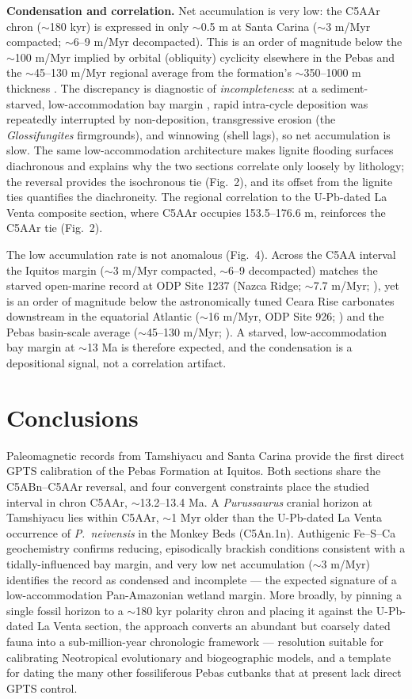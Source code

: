 \documentclass[12pt]{article}
\begin{document}
\textbf{Condensation and correlation.} Net accumulation is very low: the C5AAr chron
($\sim$180 kyr) is expressed in only $\sim$0.5 m at Santa Carina ($\sim$3 m/Myr compacted;
$\sim$6--9 m/Myr decompacted). This is an order of magnitude below the $\sim$100 m/Myr
implied by orbital (obliquity) cyclicity elsewhere in the Pebas \citep{Hoorn2022} and the
$\sim$45--130 m/Myr regional average from the formation's $\sim$350--1000 m thickness
\citep{Hoorn2010}. The discrepancy is diagnostic of \emph{incompleteness}: at a
sediment-starved, low-accommodation bay margin \citep{Gingras2002}, rapid intra-cycle
deposition was repeatedly interrupted by non-deposition, transgressive erosion (the
\textit{Glossifungites} firmgrounds), and winnowing (shell lags), so net accumulation is
slow. The same low-accommodation architecture makes lignite flooding surfaces diachronous
and explains why the two sections correlate only loosely by lithology; the reversal
provides the isochronous tie (Fig.~2), and its offset from the lignite ties quantifies the
diachroneity. The regional correlation to the U-Pb-dated La Venta composite section, where C5AAr occupies
153.5--176.6 m, reinforces the C5AAr tie (Fig.~2).

The low accumulation rate is not anomalous (Fig.~4). Across the C5AA interval the Iquitos
margin ($\sim$3 m/Myr compacted, $\sim$6--9 decompacted) matches the starved open-marine record
at ODP Site 1237 (Nazca Ridge; $\sim$7.7 m/Myr; \citealp{Mix2003}), yet is an order of magnitude
below the astronomically tuned Ceara Rise carbonates downstream in the equatorial Atlantic
($\sim$16 m/Myr, ODP Site 926; \citealp{BackmanRaffi1997}) and the Pebas basin-scale average
($\sim$45--130 m/Myr; \citealp{Hoorn2010,Hoorn2022}). A starved, low-accommodation bay margin at
$\sim$13 Ma is therefore expected, and the condensation is a depositional signal, not a
correlation artifact.

\section*{Conclusions}
Paleomagnetic records from Tamshiyacu and Santa Carina provide the first direct GPTS
calibration of the Pebas Formation at Iquitos. Both sections share the C5ABn--C5AAr
reversal, and four convergent constraints place the studied interval in chron C5AAr,
$\sim$13.2--13.4 Ma. A \textit{Purussaurus} cranial horizon at Tamshiyacu lies within
C5AAr, $\sim$1 Myr older than the U-Pb-dated La Venta occurrence of \textit{P.\ neivensis} in the
Monkey Beds (C5An.1n). Authigenic Fe--S--Ca geochemistry confirms reducing, episodically brackish
conditions consistent with a tidally-influenced bay margin, and very low net accumulation
($\sim$3 m/Myr) identifies the record as condensed and incomplete --- the expected
signature of a low-accommodation Pan-Amazonian wetland margin. More broadly, by pinning a
single fossil horizon to a $\sim$180 kyr polarity chron and placing it against the U-Pb-dated
La Venta section, the approach converts an abundant but coarsely dated
fauna into a sub-million-year chronologic framework --- resolution suitable for calibrating
Neotropical evolutionary and biogeographic models, and a template for dating the many other
fossiliferous Pebas cutbanks that at present lack direct GPTS control.
\end{document}
